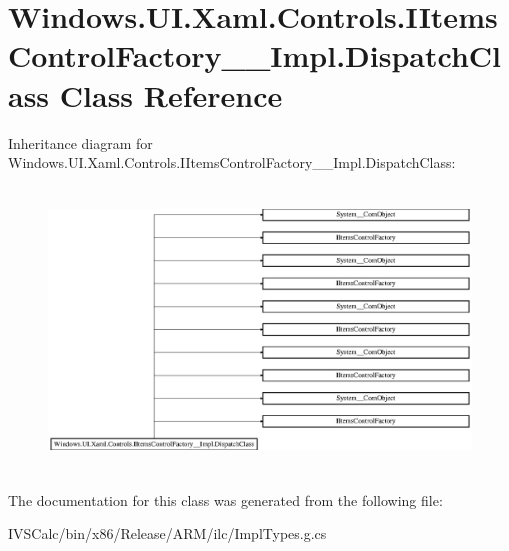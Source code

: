 \hypertarget{class_windows_1_1_u_i_1_1_xaml_1_1_controls_1_1_i_items_control_factory_____impl_1_1_dispatch_class}{}\section{Windows.\+U\+I.\+Xaml.\+Controls.\+I\+Items\+Control\+Factory\+\_\+\+\_\+\+Impl.\+Dispatch\+Class Class Reference}
\label{class_windows_1_1_u_i_1_1_xaml_1_1_controls_1_1_i_items_control_factory_____impl_1_1_dispatch_class}
Inheritance diagram for Windows.\+U\+I.\+Xaml.\+Controls.\+I\+Items\+Control\+Factory\+\_\+\+\_\+\+Impl.\+Dispatch\+Class\+:\begin{figure}[H]
\begin{center}
\leavevmode
\includegraphics[height=7.549020cm]{class_windows_1_1_u_i_1_1_xaml_1_1_controls_1_1_i_items_control_factory_____impl_1_1_dispatch_class}
\end{center}
\end{figure}


The documentation for this class was generated from the following file\+:\begin{DoxyCompactItemize}
\item 
I\+V\+S\+Calc/bin/x86/\+Release/\+A\+R\+M/ilc/Impl\+Types.\+g.\+cs\end{DoxyCompactItemize}
